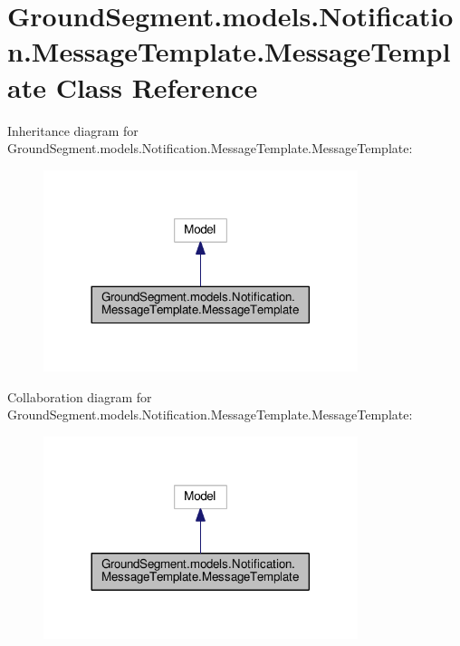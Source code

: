 \hypertarget{class_ground_segment_1_1models_1_1_notification_1_1_message_template_1_1_message_template}{}\section{Ground\+Segment.\+models.\+Notification.\+Message\+Template.\+Message\+Template Class Reference}
\label{class_ground_segment_1_1models_1_1_notification_1_1_message_template_1_1_message_template}


Inheritance diagram for Ground\+Segment.\+models.\+Notification.\+Message\+Template.\+Message\+Template\+:\nopagebreak
\begin{figure}[H]
\begin{center}
\leavevmode
\includegraphics[width=260pt]{class_ground_segment_1_1models_1_1_notification_1_1_message_template_1_1_message_template__inherit__graph}
\end{center}
\end{figure}


Collaboration diagram for Ground\+Segment.\+models.\+Notification.\+Message\+Template.\+Message\+Template\+:\nopagebreak
\begin{figure}[H]
\begin{center}
\leavevmode
\includegraphics[width=260pt]{class_ground_segment_1_1models_1_1_notification_1_1_message_template_1_1_message_template__coll__graph}
\end{center}
\end{figure}
